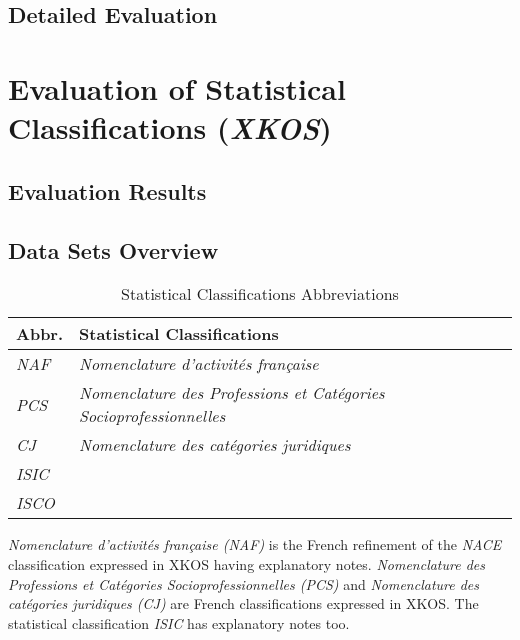 \documentclass{llncs}
\begin{document}
\subsection{Detailed Evaluation}

\section{Evaluation of Statistical Classifications (\emph{XKOS})}

\subsection{Evaluation Results}

\subsection{Data Sets Overview}

\begin{table}[H]
	\centering
		\begin{tabular}{l|l}
      \textbf{Abbr.} & \textbf{Statistical Classifications} \\		
      \hline
    \emph{NAF} & \emph{Nomenclature d'activités française}\tablefootnote{\url{http://rdf.insee.fr/codes/index.html}} \\
		\emph{PCS} & \emph{Nomenclature des Professions et Catégories Socioprofessionnelles}\tablefootnote{\url{http://rdf.insee.fr/codes/index.html}} \\
		\emph{CJ} & \emph{Nomenclature des catégories juridiques}\tablefootnote{\url{http://rdf.insee.fr/codes/index.html}} \\
		\emph{ISIC} & \\
		\emph{ISCO} & \\
		\end{tabular}
	\caption{Statistical Classifications Abbreviations}
	\label{tab:statistical-classifications-abbreviations}
\end{table}

\emph{Nomenclature d'activités française (NAF)} is the French refinement of the \emph{NACE} classification expressed in XKOS having explanatory notes.
\emph{Nomenclature des Professions et Catégories Socioprofessionnelles (PCS)} and \emph{Nomenclature des catégories juridiques (CJ)} are French classifications expressed in XKOS.
The statistical classification \emph{ISIC} has explanatory notes too. 
\end{document}
